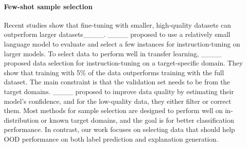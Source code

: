 \paragraph{Few-shot sample selection}
Recent studies show that fine-tuning with smaller, high-quality datasets can outperform larger datasets____.
____ proposed to use a relatively small language model to evaluate and select a few instances for instruction-tuning on larger models.
To select data to perform well in transfer learning, ____ proposed data selection for instruction-tuning on a target-specific domain. 
They show that training with 5\% of the data outperforms training with the full dataset. The main constraint is that the validation set needs to be from the target domains.
____ proposed to improve data quality by estimating their model's confidence, and for the low-quality data, they either filter or correct them.
Most methods for sample selection are designed to perform well on in-distribution or known target domains, and the goal is for better classification performance. In contrast, our work focuses on selecting data that should help OOD performance on both label prediction and explanation generation.